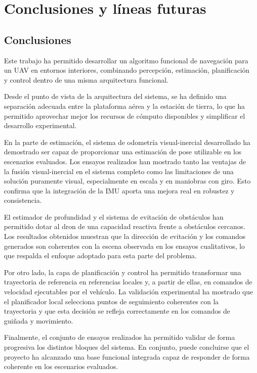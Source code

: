 \chapter{Conclusiones y líneas futuras}

\section{Conclusiones}
\par
Este trabajo ha permitido desarrollar un algoritmo funcional de navegaci\'on para un UAV en entornos interiores, 
combinando percepci\'on, estimaci\'on, planificaci\'on y control dentro de una misma arquitectura funcional.

Desde el punto de vista de la arquitectura del sistema, se ha definido una separaci\'on adecuada entre la plataforma a\'erea 
y la estaci\'on de tierra, lo que ha permitido aprovechar mejor los recursos de c\'omputo disponibles y simplificar el 
desarrollo experimental.

En la parte de estimaci\'on, el sistema de odometr\'ia visual-inercial desarrollado ha demostrado ser capaz de proporcionar 
una estimaci\'on de pose utilizable en los escenarios evaluados. Los ensayos realizados han mostrado tanto las ventajas de la fusi\'on 
visual-inercial en el sistema completo como las limitaciones de una soluci\'on puramente visual, especialmente en escala y 
en maniobras con giro. Esto confirma que la integraci\'on de la IMU aporta una mejora real en robustez y consistencia.

El estimador de profundidad y el sistema de evitaci\'on de obst\'aculos han permitido dotar al dron de una 
capacidad reactiva frente a obst\'aculos cercanos. Los resultados obtenidos muestran que la direcci\'on de evitaci\'on y los 
comandos generados son coherentes con la escena observada en los ensayos cualitativos, lo que respalda el enfoque adoptado para esta parte del problema.

Por otro lado, la capa de planificaci\'on y control ha permitido transformar una trayectoria de referencia en referencias locales y, 
a partir de ellas, en comandos de velocidad ejecutables por el veh\'iculo. La validaci\'on experimental ha mostrado que el 
planificador local selecciona puntos de seguimiento coherentes con la trayectoria y que esta decisi\'on se refleja 
correctamente en los comandos de gui\~nada y movimiento.

Finalmente, el conjunto de ensayos realizados ha permitido validar de forma progresiva los distintos bloques del sistema. En conjunto, puede concluirse 
que el proyecto ha alcanzado una base funcional integrada capaz de responder de forma coherente en los escenarios evaluados.


